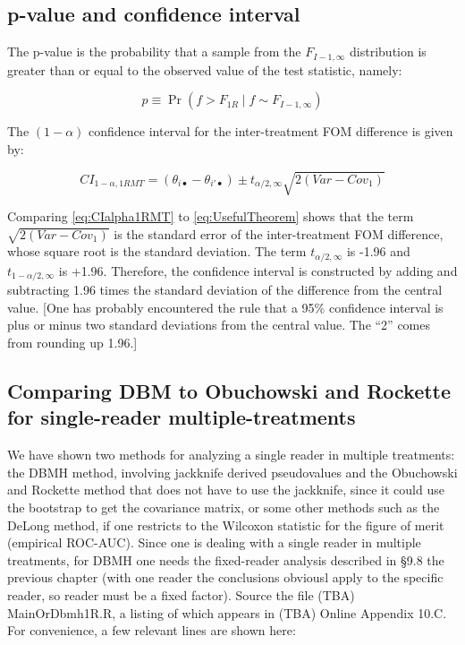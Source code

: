 \documentclass[
]{book}
\begin{document}
\hypertarget{p-value-and-confidence-interval}{%
\subsection{p-value and confidence interval}\label{p-value-and-confidence-interval}}

The p-value is the probability that a sample from the \(F_{I-1,\infty}\) distribution is greater than or equal to the observed value of the test statistic, namely:

\begin{equation}
p\equiv \Pr(f>F_{1R} \mid f \sim F_{I-1,\infty})
\label{eq:pValue1RMT}
\end{equation}

The \((1-\alpha)\) confidence interval for the inter-treatment FOM difference is given by:

\begin{equation}
CI_{1-\alpha,1RMT} = (\theta_{i\bullet} - \theta_{i'\bullet}) \pm t_{\alpha/2,\infty} \sqrt{2(Var-Cov_1)}
\label{eq:CIalpha1RMT}
\end{equation}

Comparing \eqref{eq:CIalpha1RMT} to \eqref{eq:UsefulTheorem} shows that the term \(\sqrt{2(Var-Cov_1)}\) is the standard error of the inter-treatment FOM difference, whose square root is the standard deviation. The term \(t_{\alpha/2,\infty}\) is -1.96 and \(t_{1-\alpha/2,\infty}\) is +1.96. Therefore, the confidence interval is constructed by adding and subtracting 1.96 times the standard deviation of the difference from the central value. {[}One has probably encountered the rule that a 95\% confidence interval is plus or minus two standard deviations from the central value. The ``2'' comes from rounding up 1.96.{]}

\hypertarget{comparing-dbm-to-obuchowski-and-rockette-for-single-reader-multiple-treatments}{%
\subsection{Comparing DBM to Obuchowski and Rockette for single-reader multiple-treatments}\label{comparing-dbm-to-obuchowski-and-rockette-for-single-reader-multiple-treatments}}

We have shown two methods for analyzing a single reader in multiple treatments: the DBMH method, involving jackknife derived pseudovalues and the Obuchowski and Rockette method that does not have to use the jackknife, since it could use the bootstrap to get the covariance matrix, or some other methods such as the DeLong method, if one restricts to the Wilcoxon statistic for the figure of merit (empirical ROC-AUC). Since one is dealing with a single reader in multiple treatments, for DBMH one needs the fixed-reader analysis described in §9.8 the previous chapter (with one reader the conclusions obviousl apply to the specific reader, so reader must be a fixed factor). Source the file (TBA) MainOrDbmh1R.R, a listing of which appears in (TBA) Online Appendix 10.C. For convenience, a few relevant lines are shown here:
\end{document}
